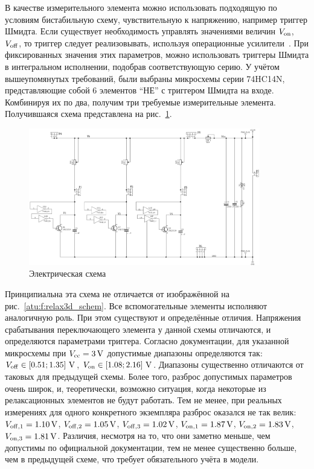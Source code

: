В качестве измерительного элемента можно использовать
подходящую по условиям бистабильную схему,
чувствительную к напряжению, например триггер Шмидта.
Если существует необходимость управлять
значениями величин
$V_\mathrm{on}$, $V_\mathrm{off}$,
то триггер следует реализовывать,
используя операционные усилители~\cite{horowitz}.
При фиксированных значения этих параметров,
можно использовать триггеры Шмидта в интегральном исполнении,
подобрав соответствующую серию.
У учётом вышеупомянутых требований,
были выбраны микросхемы серии 74HC14N,
представляющие собой 6 элементов ``НЕ''
с триггером Шмидта на входе. Комбинируя их по два,
получим три требуемые измерительные элемента.
Получившаяся схема представлена на рис.~\ref{atu:f:relax3ds_schem}.


\begin{figure}[htb!]
  \centerline{\includegraphics[width=0.9\textwidth]{p/relax3ds_schem.png} }
  \caption{Электрическая схема \RelaxShIi}
  \label{atu:f:relax3ds_schem}
\end{figure}

Принципиальна эта схема не отличается от изображённой на рис.~\ref{atu:f:relax3d_schem}.
Все вспомогательные элементы исполняют аналогичную роль.
При этом существуют и определённые отличия.
Напряжения срабатывания переключающего элемента
у данной схемы отличаются, и определяются
параметрами триггера.
Согласно документации, для указанной микросхемы
при $V_\mathrm{cc} = \SI{3}{\volt} $
допустимые диапазоны определяются так:
$V_\mathrm{off} \in [ 0.51; 1.35 ]~ \SI{}{\volt}$,
$V_\mathrm{on}  \in [ 1.08; 2.16 ]~ \SI{}{\volt}$.
Диапазоны существенно отличаются от таковых для предыдущей схемы.
Более того, разброс допустимых параметров очень широк,
и, теоретически, возможно ситуация, когда некоторые из релаксационных
элементов не будут работать.
Тем не менее, при реальных измерениях
для одного конкретного экземпляра
разброс оказался не так велик:
$V_\mathrm{off,1} = \SI{1.10}{\volt}$,
$V_\mathrm{off,2} = \SI{1.05}{\volt}$,
$V_\mathrm{off,3} = \SI{1.02}{\volt}$,
$V_\mathrm{on,1}  = \SI{1.87}{\volt}$,
$V_\mathrm{on,2}  = \SI{1.83}{\volt}$,
$V_\mathrm{on,3}  = \SI{1.81}{\volt}$.
Различия, несмотря на то, что они заметно меньше, чем допустимы по официальной документации,
тем не менее существенно больше, чем в предыдущей схеме, что требует
обязательного учёта в модели.

